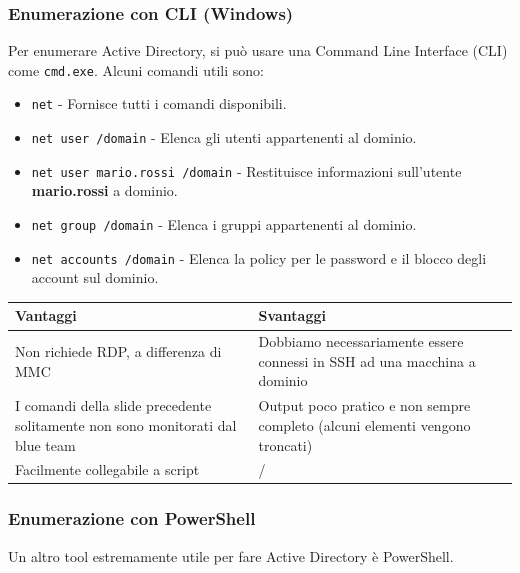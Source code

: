 \documentclass{article}
\begin{document}
\subsubsection{Enumerazione con CLI (Windows)}
Per enumerare Active Directory, si può usare una Command Line Interface (CLI) come \verb|cmd.exe|. Alcuni comandi utili sono:
\begin{itemize}
	\item \verb|net| - Fornisce tutti i comandi disponibili.
	\item \verb|net user /domain| - Elenca gli utenti appartenenti al dominio.
	\item \verb|net user mario.rossi /domain| - Restituisce informazioni sull’utente \textbf{mario.rossi} a dominio.
	\item \verb|net group /domain| - Elenca i gruppi appartenenti al dominio.
	\item \verb|net accounts /domain| - Elenca la policy per le password e il blocco degli account sul dominio.
\end{itemize}

\begin{table}[H]
	\centering
	\begin{tabular}{|m{7cm}|m{7cm}|}
		\hline
		\textbf{Vantaggi} & \textbf{Svantaggi} \\
		\hline
		Non richiede RDP, a differenza di MMC & Dobbiamo necessariamente essere connessi in SSH ad una macchina a dominio \\
		\hline
		I comandi della slide precedente solitamente non sono monitorati dal blue team & Output poco pratico e non sempre completo (alcuni elementi vengono troncati) \\
		\hline
		Facilmente collegabile a script  &  \quad\quad\quad\quad\quad\quad\quad\quad\quad/ \\
		\hline
	\end{tabular}
\end{table}

\newpage

\subsubsection{Enumerazione con PowerShell}
Un altro tool estremamente utile per fare Active Directory è PowerShell.
\end{document}
